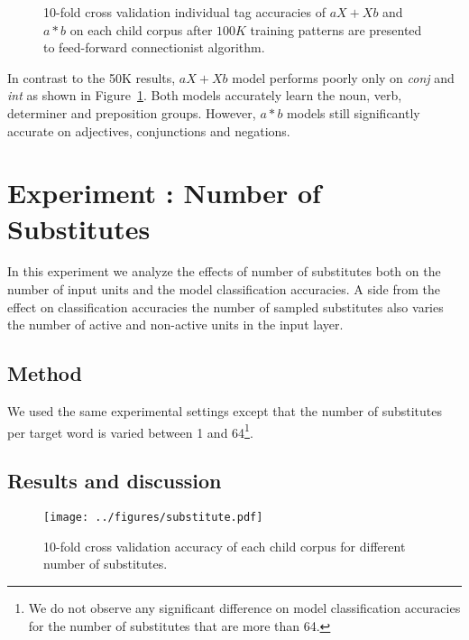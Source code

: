 \begin{figure}[h]
  \caption{10-fold cross validation individual tag accuracies of $aX+Xb$ and
  $a*b$ on each child corpus after $100K$ training patterns are presented to
  feed-forward connectionist algorithm.  }
  \label{fig:category100K}
\end{figure}

In contrast to the 50K results, $aX+Xb$ model performs poorly only on {\it
conj} and {\it int} as shown in Figure~\ref{fig:category100K}.  Both models
accurately learn the noun, verb, determiner and preposition groups.  However,
$a*b$ models still significantly accurate on adjectives, conjunctions and
negations.

\section{Experiment : Number of Substitutes}
\label{s:exp_substitutes}
In this experiment we analyze the effects of number of substitutes both on the
number of input units and the model classification accuracies.  A side from the
effect on classification accuracies the number of sampled substitutes also
varies the number of active and non-active units in the input layer.  

\subsection{Method} 
We used the same experimental settings except that the number of substitutes
per target word is varied between 1 and 64\footnote{We do not observe any
significant difference on model classification accuracies for the number of
substitutes that are more than 64.}.

\subsection{Results and discussion}
\begin{figure}[ht]
  \centering
  \texttt{[image: ../figures/substitute.pdf]}
  \caption{10-fold cross validation accuracy of each child corpus for different
  number of substitutes.}
  \label{fig:substitutes}
\end{figure} 

